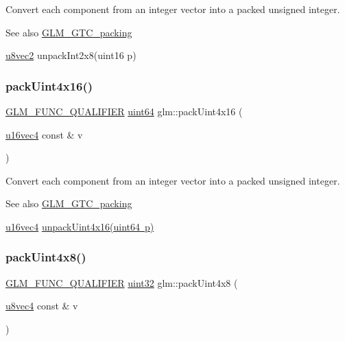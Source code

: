 Convert each component from an integer vector into a packed unsigned integer.

\begin{DoxySeeAlso}{See also}
\mbox{\hyperlink{group__gtc__packing}{G\+L\+M\+\_\+\+G\+T\+C\+\_\+packing}} 

\mbox{\hyperlink{group__gtc__type__precision_ga01e28d0272428f94d22ea6111f0112be}{u8vec2}} unpack\+Int2x8(uint16 p) 
\end{DoxySeeAlso}
\mbox{\label{group__gtc__packing_ga19813cb34dd7102f9612ba6c0d9ef377}} 
\subsubsection{\texorpdfstring{pack\+Uint4x16()}{packUint4x16()}}
{\footnotesize\ttfamily \mbox{\hyperlink{setup_8hpp_a33fdea6f91c5f834105f7415e2a64407}{G\+L\+M\+\_\+\+F\+U\+N\+C\+\_\+\+Q\+U\+A\+L\+I\+F\+I\+ER}} \mbox{\hyperlink{group__gtc__type__precision_gae3632bf9b37da66233d78930dd06378a}{uint64}} glm\+::pack\+Uint4x16 (\begin{DoxyParamCaption}\item[{\mbox{\hyperlink{group__gtc__type__precision_ga049d45ad8d0f78578d7ceb86a7fdaae4}{u16vec4}} const \&}]{v }\end{DoxyParamCaption})}

Convert each component from an integer vector into a packed unsigned integer.

\begin{DoxySeeAlso}{See also}
\mbox{\hyperlink{group__gtc__packing}{G\+L\+M\+\_\+\+G\+T\+C\+\_\+packing}} 

\mbox{\hyperlink{group__gtc__type__precision_ga049d45ad8d0f78578d7ceb86a7fdaae4}{u16vec4}} \mbox{\hyperlink{group__gtc__packing_gaf1eea82404af955004aae19a2dcb55f1}{unpack\+Uint4x16(uint64 p)}} 
\end{DoxySeeAlso}
\mbox{\label{group__gtc__packing_gaeb4262f799821affa62edf7067deaef9}} 
\subsubsection{\texorpdfstring{pack\+Uint4x8()}{packUint4x8()}}
{\footnotesize\ttfamily \mbox{\hyperlink{setup_8hpp_a33fdea6f91c5f834105f7415e2a64407}{G\+L\+M\+\_\+\+F\+U\+N\+C\+\_\+\+Q\+U\+A\+L\+I\+F\+I\+ER}} \mbox{\hyperlink{group__gtc__type__precision_ga202b6a53c105fcb7e531f9b443518451}{uint32}} glm\+::pack\+Uint4x8 (\begin{DoxyParamCaption}\item[{\mbox{\hyperlink{group__gtc__type__precision_ga6c8841fa492bd5b1078b171452fd6974}{u8vec4}} const \&}]{v }\end{DoxyParamCaption})}

